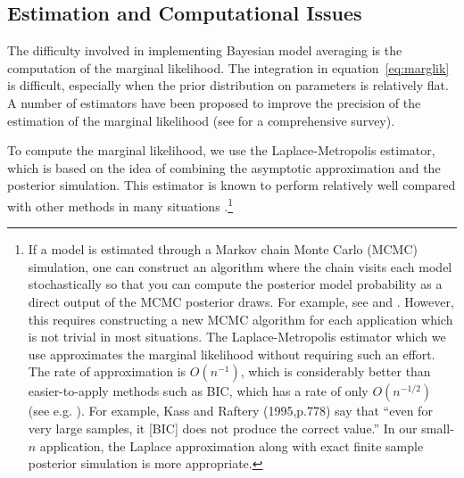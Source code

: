 \documentclass[11pt,titlepage]{article}
\renewcommand{\P}{\text{P}}
\begin{document}
\subsection{Estimation and Computational Issues}

The difficulty involved in implementing Bayesian model averaging is
the computation of the marginal likelihood. The integration in
equation~\ref{eq:marglik} is difficult, especially when the prior
distribution on parameters is relatively flat. A number of estimators
have been proposed to improve the precision of the estimation of the
marginal likelihood (see \citet{kass:raft:95} for a comprehensive
survey).

To compute the marginal likelihood, we use the Laplace-Metropolis
estimator, which is based on the idea of combining the asymptotic
approximation and the posterior simulation. This estimator is known to
perform relatively well compared with other methods in many situations
\citep{raft:96,lewi:raft:97,dici:kass:raft:wass:97}.\footnote{If a
  model is estimated through a Markov chain Monte Carlo (MCMC)
  simulation, one can construct an algorithm where the chain visits
  each model stochastically so that you can compute the posterior
  model probability as a direct output of the MCMC posterior draws.
  For example, see \citet{carl:chib:95} and \citet{geor:mccu:93}.
  However, this requires constructing a new MCMC algorithm for each
  application which is not trivial in most situations.  The
  Laplace-Metropolis estimator which we use approximates the marginal
  likelihood without requiring such an effort.  The rate of
  approximation is $O(n^{-1})$, which is considerably better than
  easier-to-apply methods such as BIC, which has a rate of only
  $O(n^{-1/2})$ (see e.g. \citet{kass:tier:kada:89}). For example,
  Kass and Raftery (1995,p.778) say that ``even for very large
  samples, it [BIC] does not produce the correct value.''  In our
  small-$n$ application, the Laplace approximation along with exact
  finite sample posterior simulation is more appropriate.}

\end{document}
